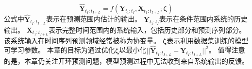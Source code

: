 \begin{equation}
\label{equa:problematique}
    \hat{\boldsymbol Y}_{t_{I}:t_{I+L}} = f(\boldsymbol Y_{t_{1}:t_{I}}, \boldsymbol X_{t_{1}:t_{I+L}};\boldsymbol \zeta) 
\end{equation}
公式中$\hat{\boldsymbol Y}_{t_{I}:t_{I+L}}$表示在预测范围内估计的输出。 
$\boldsymbol Y_{t_{1}:t_{I}}$表示在条件范围内系统的历史输出。
$\boldsymbol X_{t_{1}:t_{I+L}}$表示完整时间范围内的系统输入，包括历史部分和预测序列部分。该系统输入在时间序列预测领域经常被称为协变量\cite{Wu2020}。
$\boldsymbol \zeta$表示利用数据集训练的模型可学习参数。
本章的目标为通过优化$\boldsymbol \zeta$以最小化$||\hat{\boldsymbol Y}_{t_{I}:t_{I+L}}-\boldsymbol {Y}_{t_{I}:t_{I+L}}||^2$。
值得注意的是，本章仍关注开环预测问题，模型预测过程中无法收到来自系统输出的反馈。


